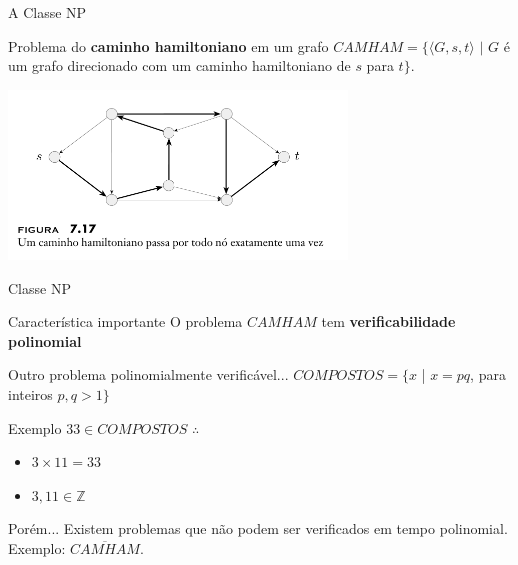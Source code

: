 \documentclass[xcolor=dvipsnames,table]{beamer}
\begin{document}
	\begin{frame}{A Classe NP}
		\begin{block}{Problema do {\bf caminho hamiltoniano} em um grafo}
			$CAMHAM = \{ \langle G, s, t \rangle \mbox{ | } G$ é um grafo direcionado com um caminho hamiltoniano de $s$ para $t \}$.
		\end{block}
		\begin{center}
			\includegraphics[width=9cm]{images/camHam.png}
		\end{center}
	\end{frame}	
	
	\begin{frame}[shrink]{Classe NP}
		\begin{block}{Característica importante}
			O problema $CAMHAM$ tem {\bf verificabilidade polinomial}
		\end{block} \pause
		\begin{block}{Outro problema polinomialmente verificável...}
			$COMPOSTOS = \{ x$ | $x = pq$, para inteiros $p,q > 1 \}$
		\end{block} \pause
		\begin{exampleblock}{Exemplo}
			$33 \in COMPOSTOS$ $\therefore$ \pause
			\begin{itemize}
				\item $3 \times 11 = 33$
				\item $3, 11 \in \mathbb{Z}$
			\end{itemize}
		\end{exampleblock} \pause
		\begin{alertblock}{Porém...}
			Existem problemas que não podem ser verificados em tempo polinomial. Exemplo: $\overline{CAMHAM}$.
		\end{alertblock}
	\end{frame}
	
\end{document}
